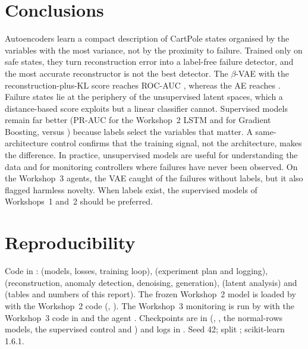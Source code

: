 \documentclass[conference]{IEEEtran}
\begin{document}
\section{Conclusions}
Autoencoders learn a compact description of CartPole states organised by the variables with
the most variance, not by the proximity to failure. Trained only on safe states, they turn
reconstruction error into a label-free failure detector, and the most accurate reconstructor
is not the best detector. The $\beta$-VAE with the reconstruction-plus-KL score reaches
ROC-AUC \vaeklAUC{}, whereas the AE reaches \aeAUC. Failure states lie at the periphery of the
unsupervised latent spaces, which a distance-based score exploits but a linear classifier
cannot. Supervised models remain far better (PR-AUC \supPR{} for the Workshop~2 LSTM and
\gbPR{} for Gradient Boosting, versus \vaeklPR) because labels select the variables that
matter. A same-architecture control confirms that the training signal, not the
architecture, makes the difference. In practice, unsupervised models are
useful for understanding the data and for monitoring controllers where failures have never
been observed. On the Workshop~3 agents, the VAE caught \monVaeCaught{} of the failures
without labels, but it also flagged harmless novelty. When labels exist, the supervised models of Workshops~1 and~2 should be
preferred.

\section*{Reproducibility}
Code in :  (models, losses, training loop),
 (experiment plan and logging), 
(reconstruction, anomaly detection, denoising, generation), 
(latent analysis) and  (tables and numbers of this report).
The frozen Workshop~2 model is loaded by  with the
Workshop~2 code (, ). The
Workshop~3 monitoring is run by  with the Workshop~3 code
in  and the agent .
Checkpoints are in  (,
, the normal-rows models, the supervised control and
) and logs in . Seed 42; split
; scikit-learn 1.6.1.
\end{document}
